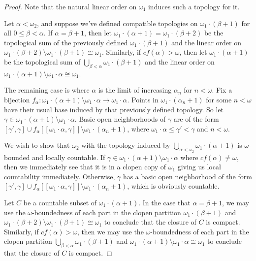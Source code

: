 \documentclass[11pt]{article}
\begin{document}
  \begin{proof}
    Note that the natural linear order on \(\omega_1\) induces such
    a topology for it.

    Let \(\alpha<\omega_2\), and suppose we've defined compatible topologies on
    \(\omega_1\cdot (\beta+1)\) for all \(0\leq\beta<\alpha\).
    If \(\alpha=\beta+1\), then let
    \(\omega_1\cdot(\alpha+1)=\omega_1\cdot(\beta+2)\) be the topological sum
    of the previously defined \(\omega_1\cdot(\beta+1)\) and the linear order
    on \(\omega_1\cdot(\beta+2)\setminus\omega_1\cdot(\beta+1)\cong\omega_1\).
    Similarly, if \(cf(\alpha)>\omega\), then let \(\omega_1\cdot(\alpha+1)\)
    be the topological sum of \(\bigcup_{\beta<\alpha}\omega_1\cdot(\beta+1)\)
    and the linear order on
    \(\omega_1\cdot(\alpha+1)\setminus\omega_1\cdot\alpha\cong\omega_1\).

    The remaining case is where \(\alpha\) is the limit of increasing
    \(\alpha_n\) for \(n<\omega\). Fix a bijection
    \(
      f_\alpha
        :
      \omega_1\cdot(\alpha+1)\setminus\omega_1\cdot\alpha
        \to
      \omega_1\cdot\alpha
    \). Points in \(\omega_1\cdot(\alpha_n+1)\) for some \(n<\omega\)
    have their usual base induced by that previously defined topology. So let
    \(\gamma\in\omega_1\cdot(\alpha+1)\setminus\omega_1\cdot\alpha\).
    Basic open neighborhoods of \(\gamma\) are of the form
    \(
      [\gamma',\gamma]
        \cup
      f_\alpha[[\omega_1\cdot\alpha,\gamma]]
        \setminus
      \omega_1\cdot(\alpha_n+1)
    \),
    where \(\omega_1\cdot\alpha\leq\gamma'<\gamma\)
    and \(n<\omega\).

    We wish to show that \(\omega_2\) with the topology induced by
    \(\bigcup_{\alpha<\omega_2}\omega_1\cdot(\alpha+1)\) is \(\omega\)-bounded
    and locally countable. If
    \(\gamma\in\omega_1\cdot(\alpha+1)\setminus\omega_1\cdot\alpha\) where
    \(cf(\alpha)\not=\omega\), then we immediately see that it is in a clopen
    copy of \(\omega_1\) giving us local countability
    immediately. Otherwise, \(\gamma\) has a basic open neighborhood of the form
    \(
      [\gamma',\gamma]
        \cup
      f_\alpha[[\omega_1\cdot\alpha,\gamma]]
        \setminus
      \omega_1\cdot(\alpha_n+1)
    \),
    which is obviously countable.

    Let \(C\) be a countable subset of \(\omega_1\cdot(\alpha+1)\).
    In the case that \(\alpha=\beta+1\), we may use the \(\omega\)-boundedness
    of each part in the clopen partition \(\omega_1\cdot(\beta+1)\) and
    \(\omega_1\cdot(\beta+2)\setminus\omega_1\cdot(\beta+1)\cong\omega_1\)
    to conclude that the closure of \(C\) is compact.
    Similarly, if \(cf(\alpha)>\omega\),
    then we may use the  \(\omega\)-boundedness
    of each part in the clopen partition
    \(\bigcup_{\beta<\alpha}\omega_1\cdot(\beta+1)\) and
    \(\omega_1\cdot(\alpha+1)\setminus\omega_1\cdot\alpha\cong\omega_1\)
    to conclude that the closure of \(C\) is compact.


\end{proof}
\end{document}
